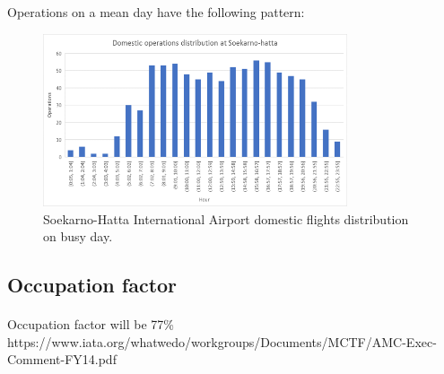Operations on a mean day have the following pattern:
\begin{figure}[H]
	\centering
	\includegraphics[clip, trim=0.1cm 0.1cm 0.1cm 0.1cm, width=0.8\textwidth]{./images/PROGNOSIS/hourDom}
	\caption{Soekarno-Hatta International Airport domestic flights distribution on busy day.}
	\label{hourDom}
\end{figure}

	
	\subsection{Occupation factor}
	\paragraph{} Occupation factor will be 77\%
	https://www.iata.org/whatwedo/workgroups/Documents/MCTF/AMC-Exec-Comment-FY14.pdf
	\cite{IATA_PLF}
	
	